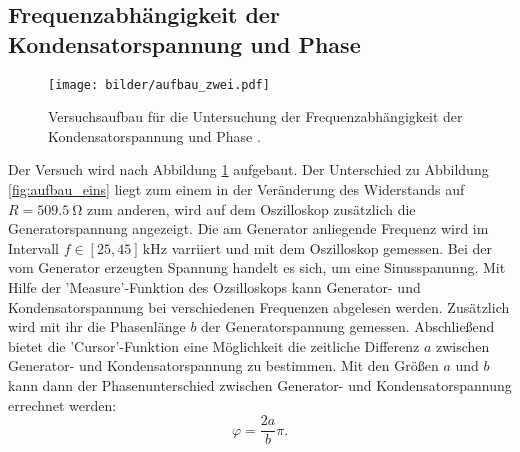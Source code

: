 \subsection{Frequenzabhängigkeit der Kondensatorspannung und Phase}
\begin{figure}
  \centering
  \texttt{[image: bilder/aufbau\_zwei.pdf]}
  \caption{Versuchsaufbau für die Untersuchung der Frequenzabhängigkeit der Kondensatorspannung und Phase \cite{anleitung354}. }
  \label{fig:aufbau_zwei}
\end{figure}
Der Versuch wird nach Abbildung \ref{fig:aufbau_zwei} aufgebaut.
Der Unterschied zu Abbildung \ref{fig:aufbau_eins} liegt zum einem
in der Veränderung des Widerstands auf $R=\SI{509.5}{\ohm}$ zum anderen, wird
auf dem Oszilloskop zusätzlich die Generatorspannung angezeigt.
Die am Generator anliegende Frequenz wird im Intervall $f\in\left[25,45\right]\,\si{\kilo\hertz}$
varriiert und mit dem Oszilloskop gemessen. Bei der vom Generator erzeugten Spannung handelt es sich, um
eine Sinusspanunng. Mit Hilfe der 'Measure'-Funktion des Ozsilloskops %
kann Generator- und Kondensatorspannung bei verschiedenen Frequenzen %
abgelesen werden. Zusätzlich wird mit ihr die Phasenlänge $b$ der Generatorspannung
gemessen. Abschließend bietet die 'Cursor'-Funktion eine Möglichkeit %
die zeitliche Differenz $a$ zwischen Generator- und Kondensatorspannung zu
bestimmen.
Mit den Größen $a$ und $b$ kann dann der Phasenunterschied zwischen
Generator- und Kondensatorspannung errechnet werden:
\begin{equation}
  \label{eq:phasen_unterschied}
  \varphi=\frac{2a}{b}\pi.
\end{equation}
